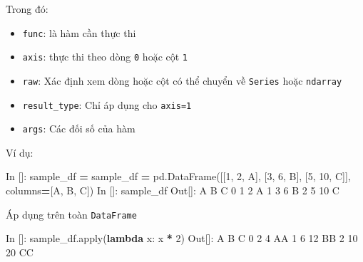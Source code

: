 \documentclass[
]{book}
\newenvironment{Shaded}{\begin{snugshade}}{\end{snugshade}}
\newcommand{\BuiltInTok}[1]{#1}
\newcommand{\DecValTok}[1]{\textcolor[rgb]{0.00,0.00,0.81}{#1}}
\newcommand{\KeywordTok}[1]{\textcolor[rgb]{0.13,0.29,0.53}{\textbf{#1}}}
\newcommand{\NormalTok}[1]{#1}
\newcommand{\OperatorTok}[1]{\textcolor[rgb]{0.81,0.36,0.00}{\textbf{#1}}}
\newcommand{\StringTok}[1]{\textcolor[rgb]{0.31,0.60,0.02}{#1}}
\begin{document}
Trong đó:

\begin{itemize}
\item
  \texttt{func}: là hàm cần thực thi
\item
  \texttt{axis}: thực thi theo dòng \texttt{0} hoặc cột \texttt{1}
\item
  \texttt{raw}: Xác định xem dòng hoặc cột có thể chuyển về \texttt{Series} hoặc \texttt{ndarray}
\item
  \texttt{result\_type}: Chỉ áp dụng cho \texttt{axis=1}
\item
  \texttt{args}: Các đối số của hàm
\end{itemize}

Ví dụ:

\begin{Shaded}
\begin{Highlighting}[]
\NormalTok{In []: sample\_df }\OperatorTok{=}\NormalTok{ sample\_df }\OperatorTok{=}\NormalTok{ pd.DataFrame([[}\DecValTok{1}\NormalTok{, }\DecValTok{2}\NormalTok{, }\StringTok{\textquotesingle{}A\textquotesingle{}}\NormalTok{], [}\DecValTok{3}\NormalTok{, }\DecValTok{6}\NormalTok{, }\StringTok{\textquotesingle{}B\textquotesingle{}}\NormalTok{], [}\DecValTok{5}\NormalTok{, }\DecValTok{10}\NormalTok{, }\StringTok{\textquotesingle{}C\textquotesingle{}}\NormalTok{]], columns}\OperatorTok{=}\NormalTok{[}\StringTok{\textquotesingle{}A\textquotesingle{}}\NormalTok{, }\StringTok{\textquotesingle{}B\textquotesingle{}}\NormalTok{, }\StringTok{\textquotesingle{}C\textquotesingle{}}\NormalTok{])}
\NormalTok{In []: sample\_df}
\NormalTok{Out[]:}
\NormalTok{   A   B  C}
\DecValTok{0}  \DecValTok{1}   \DecValTok{2}\NormalTok{  A}
\DecValTok{1}  \DecValTok{3}   \DecValTok{6}\NormalTok{  B}
\DecValTok{2}  \DecValTok{5}  \DecValTok{10}\NormalTok{  C}
\end{Highlighting}
\end{Shaded}

Áp dụng trên toàn \texttt{DataFrame}

\begin{Shaded}
\begin{Highlighting}[]
\NormalTok{In []: sample\_df.}\BuiltInTok{apply}\NormalTok{(}\KeywordTok{lambda}\NormalTok{ x: x }\OperatorTok{*} \DecValTok{2}\NormalTok{)}
\NormalTok{Out[]:}
\NormalTok{     A   B   C}
\DecValTok{0}    \DecValTok{2}   \DecValTok{4}\NormalTok{  AA}
\DecValTok{1}    \DecValTok{6}  \DecValTok{12}\NormalTok{  BB}
\DecValTok{2}   \DecValTok{10}  \DecValTok{20}\NormalTok{  CC}
\end{Highlighting}
\end{Shaded}
\end{document}
